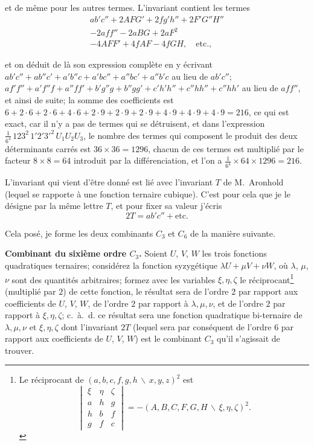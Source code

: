 \documentclass[11pt,a4paper]{article}
\theoremstyle{definition}
\begin{document}
et de m\^{e}me pour les autres termes. L'invariant contient les termes
\begin{multline*}
ab'c'' + 2AFG' + 2fg'h'' + 2F'G''H'' \\
- 2aff'' - 2aBG + 2aF^{2} \\
- 4AFF' + 4fAF - 4fGH, \quad \text{etc.},
\end{multline*}

et on d\'{e}duit de l\`{a} son expression compl\`{e}te en y \'{e}crivant
$ab'c''+ab''c'+a'b''c+a'bc''+a''bc'+a''b'c$ au lieu de $ab'c''$;
$af'f''+a'f''f+a''ff'+b'g''g+b''gg'+c'h'h''+c''hh''+c''hh'$ au lieu de $aff''$,
et ainsi de suite; la somme des coefficients est $6 + 2\cdot 6 + 2\cdot 6 + 4\cdot 6 +
2\cdot 9 + 2\cdot 9 + 2\cdot 9 + 4\cdot 9 + 4\cdot 9 + 4\cdot 9 = 216$, ce qui est exact, car
il n'y a pas de termes qui se d\'{e}truisent, et dans l'expression
$\frac{1}{6^{4}}\,123^{2}\,1'2'3'^{2}\,U_{1}U_{2}U_{3}$, le nombre des termes qui composent
le produit des deux d\'{e}terminants carr\'{e}s est $36 \times 36 = 1296$, chacun de ces termes
est multipli\'{e} par le facteur $8 \times 8 = 64$ introduit par la diff\'{e}renciation, et
l'on a $\frac{1}{6^{4}} \times 64 \times 1296 = 216$.

L'invariant qui vient d'\^{e}tre donn\'{e} est li\'{e} avec l'invariant $T$ de M.~Aronhold
(lequel se rapporte \`{a} une fonction ternaire cubique). C'est pour cela que je le d\'{e}signe
par la m\^{e}me lettre $T$, et pour fixer sa valeur j'\'{e}cris
\[2T = ab'c'' + \text{etc.}\]

Cela pos\'{e}, je forme les deux combinants $C_{3}$ et $C_{6}$ de la mani\`{e}re suivante.

\textbf{Combinant du sixi\`{e}me ordre $C_{3}$.} Soient $U$, $V$, $W$ les trois fonctions
quadratiques ternaires; consid\'{e}rez la fonction syzyg\'{e}tique $\lambda U + \mu V + \nu W$,
o\`{u} $\lambda$, $\mu$, $\nu$ sont des quantit\'{e}s arbitraires; formez avec les variables
$\xi, \eta, \zeta$ le r\'{e}ciprocant\footnote{Le r\'{e}ciprocant de $(a,b,c,f,g,h\,\backslash\!\!\,x,y,z)^{2}$
est
\[\begin{vmatrix}\xi & \eta & \zeta \\ a & h & g \\ h & b & f \\ g & f & c\end{vmatrix}
= -(A,B,C,F,G,H\,\backslash\!\!\,\xi,\eta,\zeta)^{2}.\]}
(multipli\'{e} par $2$) de cette fonction, le r\'{e}sultat sera de l'ordre $2$ par rapport
aux coefficients de $U$, $V$, $W$, de l'ordre $2$ par rapport \`{a} $\lambda, \mu, \nu$, et de
l'ordre $2$ par rapport \`{a} $\xi, \eta, \zeta$; c.~\`{a}.~d. ce r\'{e}sultat sera une fonction
quadratique bi-ternaire de $\lambda, \mu, \nu$ et $\xi, \eta, \zeta$ dont l'invariant $2T$
(lequel sera par cons\'{e}quent de l'ordre $6$ par rapport aux coefficients de $U$, $V$, $W$)
est le combinant $C_{3}$ qu'il s'agissait de trouver.
\end{document}
